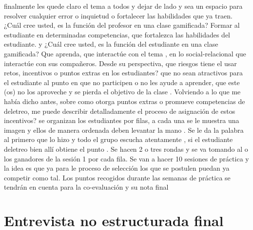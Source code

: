 \begin{dialogue}
	 finalmente les quede claro el tema a todos y dejar de lado y sea un espacio para resolver cualquier 
	 error o inquietud o fortalecer las habilidades que ya traen.
	  ¿Cuál cree usted, es la función del profesor en una clase gamificada?
	  Formar al estudiante en determinadas competencias, que fortalezca las 
	 habilidades del estudiante.
	  y ¿Cuál cree usted, es la función del estudiante en una clase gamificada?
	  Que aprenda, que interactúe con el tema , en lo social-relacional que 
	 interactúe con sus compañeros.
	  Desde su perspectiva, que riesgos tiene el usar retos, incentivos o puntos extras en 
	 los estudiantes?
	  que no sean atractivos para el estudiante al punto en que no participen o no 
	 les ayude a aprender, que este (os) no los aproveche y se pierda el objetivo de la clase .
	  Volviendo a lo que me había dicho antes, sobre como otorga puntos extras o promueve 
	 competencias de deletreo, me puede describir detalladamente el proceso de asignación de estos 
	 incentivos?
	  se organizan los estudiantes por filas, a cada una se le muestra una imagen 
	 y ellos de manera ordenada deben levantar la mano . Se le da la palabra al primero que lo hizo y todo 
	 el grupo escucha atentamente , si el estudiante deletreo bien allí obtiene el punto . Se hacen 2 o 
	 tres rondas y se va tomando al  o los ganadores de la sesión  1 por cada fila. Se van a hacer 10 
	 sesiones de práctica y la idea es que ya para le proceso de selección los que se postulen puedan ya 
	 competir como tal. Los puntos recogidos durante las semanas de práctica se tendrán en cuenta para la 
	 co-evaluación y su nota final
\end{dialogue}

\clearpage %
\section{Entrevista no estructurada final}

